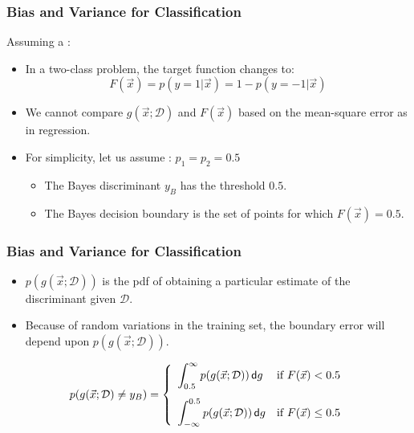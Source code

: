 \begin{frame}
  \frametitle{Bias and Variance for Classification}

  Assuming a :

  \begin{itemize}
    \item In a two-class problem, the target function changes to:
      \begin{displaymath}
        F(\vec x) = p(y = 1 | \vec x) = 1 - p(y = -1 | \vec x)
      \end{displaymath}
      \pause
    \item We cannot compare $g(\vec x ; {\mathcal{D}})$ and $F(\vec x)$ based on the mean-square error as in regression. \\[.3cm] \pause
    \item For simplicity, let us assume : $p_1 = p_2 = 0.5$
      \begin{itemize}
        \item The Bayes discriminant $y_B$ has the threshold $0.5$.
        \item The Bayes decision boundary is the set of points for which $F(\vec{x}) = 0.5$.
      \end{itemize}
  \end{itemize}
\end{frame}


\begin{frame}
  \frametitle{Bias and Variance for Classification \cont}

  
  \begin{itemize}
    \item $p(g(\vec{x}; \mathcal{D}))$ is the pdf of obtaining a particular estimate of the discriminant given $\mathcal{D}$.
    \item Because of random variations in the training set, the boundary error will depend upon $p(g(\vec{x}; \mathcal{D}))$.
  \end{itemize}

  \begin{displaymath}
    p(g(\vec x; {\mathcal{D}}) \neq y_B) =
     \left\{
       \begin{array}{l l}
         \displaystyle{ \int_{0.5}^\infty    p(g(\vec{x}; \mathcal{D})) \, \mathsf{d}g } & \mbox{if~} F(\vec{x}) <   0.5 \\[.5cm]
         \displaystyle{ \int_{-\infty}^{0.5} p(g(\vec{x}; \mathcal{D})) \, \mathsf{d}g } & \mbox{if~} F(\vec{x}) \le 0.5 \\        
       \end{array}
     \right.
  \end{displaymath}
\end{frame}


